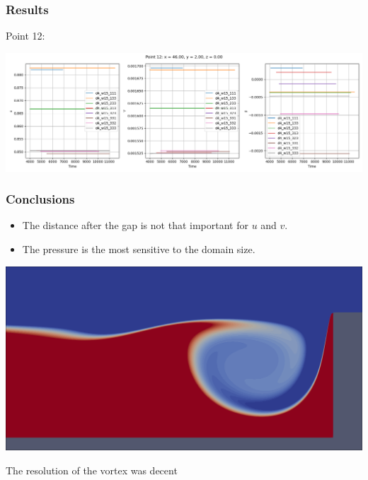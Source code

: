 \documentclass[
	aspectratio=169, %
	t, %
	onlytextwidth, %
	10pt, %
]{beamer}
\begin{document}
\begin{frame}
	\frametitle{Results}
	Point 12:

	\centering
	\includegraphics[width=\linewidth]{Images/point12.png}
\end{frame}
\begin{frame}
	\frametitle{Conclusions}

	\begin{itemize}
		\item The distance after the gap is not that important for $u$ and $v$.
		\item The pressure is the most sensitive to the domain size.
	\end{itemize}

	\centering
	\includegraphics[width=0.5\linewidth]{Images/vortex.png}

	{\small The resolution of the vortex was decent }

\end{frame}
\end{document}
